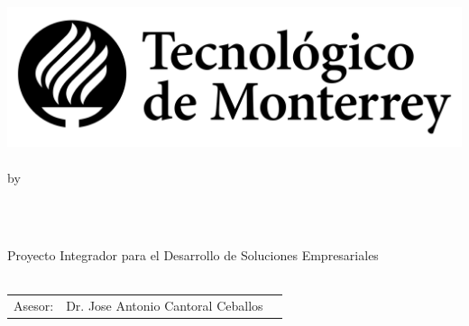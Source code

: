 \documentclass[11pt, a4paper, oneside]{Thesis}
\title{\ttitle}
\begin{document}
\frontmatter
{}

\fancyhead{}
\rhead{\thepage}
\lhead{}

\pagestyle{fancy}
\newcommand{\HRule}{\rule{\linewidth}{0.5mm}}

\hypersetup{pdfsubject=\subjectname}
\hypersetup{pdfkeywords=\keywordnames}


\begin{titlepage}
\begin{center}

\textsc{\Large \univname}\\
\textsc{\Large \facname}\\
\textsc{\Large \schoolname}\\[1cm]
\includegraphics[scale=.3]{img/logo.png} \\
\\[0.5cm]

\large by\\[0.5cm]

\begin{minipage}{0.4\textwidth}
\begin{center} \large
{}
\large{\href{mailto:albertcastaned@gmail.com?subject=Gaze-Tracking Thesis}{\authornames}} 
\\[0.5cm] 
\end{center}
\end{minipage}\\[0.5cm]

\large Proyecto Integrador para el Desarrollo de Soluciones Empresariales \\ \textit{\degreename}\\[0.8cm]

\begin{table}[!h]
\begin{center}
\begin{tabular}{lll}
\multicolumn{1}{r}{Asesor:} & Dr. Jose Antonio Cantoral Ceballos \\
\end{tabular}
\end{center}
\end{table}


\end{center}
\end{titlepage}
\end{document}
